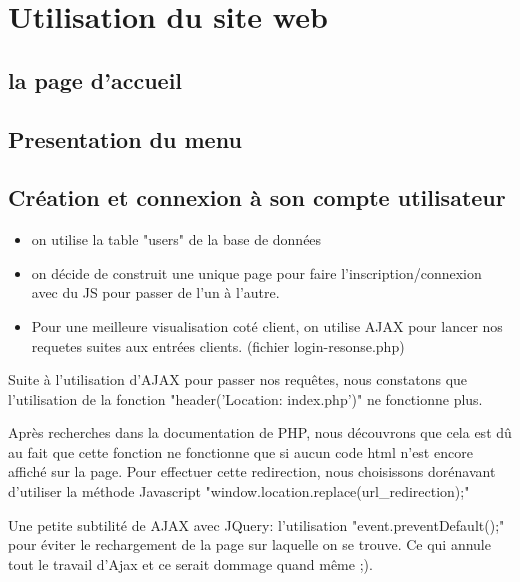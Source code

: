 \documentclass[a4paper, 11pt]{MyReport}
\begin{document}
	\chapter{Utilisation du site web}

		\section{la page d'accueil}

		\section{Presentation du menu}

		\section{Création et connexion à son compte utilisateur}

			\begin{itemize}
				\item on utilise la table "users" de la base de données
				\item on décide de construit une unique page pour faire l'inscription/connexion
				avec du JS pour passer de l'un à l'autre.
				\item Pour une meilleure visualisation coté client, on utilise AJAX pour lancer nos requetes suites aux entrées clients. (fichier login-resonse.php)
			\end{itemize}

			\begin{rmq}
				Suite à l'utilisation d'AJAX pour passer nos requêtes, nous constatons que l'utilisation de la fonction "header('Location: index.php')" ne fonctionne plus. 

				Après recherches dans la documentation de PHP, nous découvrons que cela est dû au fait que cette fonction ne fonctionne que si aucun code html n'est encore affiché sur la page. Pour effectuer cette redirection, nous choisissons dorénavant d'utiliser la méthode Javascript "window.location.replace(url\_redirection);"  
			\end{rmq}

			\begin{rmq}
				Une petite subtilité de AJAX avec JQuery: l'utilisation "event.preventDefault();" pour éviter le rechargement de la page sur laquelle on se trouve.  Ce qui annule tout le travail d'Ajax et ce serait dommage quand même ;).
			\end{rmq}
\end{document}

